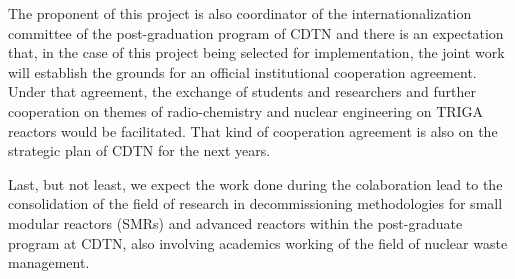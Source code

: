 \documentclass[11pt]{article} %
\begin{document}
The proponent of this project is also coordinator of the internationalization committee of the post-graduation program of CDTN and there is an expectation that, in the case of this project being selected for implementation, the joint work will establish the grounds for an official institutional cooperation agreement. Under that agreement, the exchange of students and researchers and further cooperation on themes of radio-chemistry and nuclear engineering on TRIGA reactors would be facilitated. That kind of cooperation agreement is also on the strategic plan of CDTN for the next years.

Last, but not least, we expect the work done during the colaboration lead to the consolidation of the field of research in decommissioning methodologies for small modular reactors (SMRs) and advanced reactors within the post-graduate program at CDTN, also involving academics working of the field of nuclear waste management.




\end{document}
